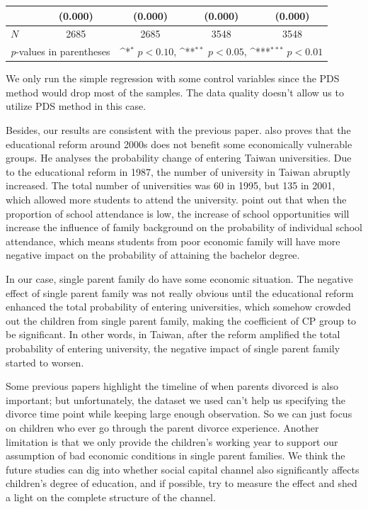 \documentclass[]{AEA}
\def\sym#1{\ifmmode^{#1}\else\(^{#1}\)\fi}
\begin{document}
\begin{center}
\begin{table}
\begin{tabular}{l*{4}c}
                &     (0.000)         &     (0.000)         &     (0.000)         &     (0.000)         \\
    \hline
    \(N\)       &        2685         &        2685         &        3548         &        3548         \\
    \hline\hline
    \multicolumn{2}{l}{\footnotesize \textit{p}-values in parentheses} & \multicolumn{3}{r}{\footnotesize \sym{*} \(p<0.10\), \sym{**} \(p<0.05\), \sym{***} \(p<0.01\)}\\
    \end{tabular}
    \begin{tablenotes}
        We only run the simple regression with some control variables since the PDS method would drop most of the samples. The data quality doesn't allow us to utilize PDS method in this case.
    \end{tablenotes}
    \end{table}
    \end{center}

    Besides, our results are consistent with the previous paper.  \cite{Luoh2004}  also proves that the educational reform around 2000s does not benefit some economically vulnerable groups. He analyses the probability change of entering Taiwan universities. Due to the educational reform in 1987, the number of university in Taiwan abruptly increased. The total number of universities was 60 in 1995, but 135 in 2001, which allowed more students to attend the university.  \cite{Luoh2004} point out that when the proportion of school attendance is low, the increase of school opportunities will increase the influence of family background on the probability of individual school attendance, which means students from poor economic family will have more negative impact on the probability of attaining the bachelor degree. 
   
    In our case, single parent family do have some economic situation. The negative effect of single parent family was not really obvious until the educational reform enhanced the total probability of entering universities, which somehow crowded out the children from single parent family, making the coefficient of CP group to be significant. In other words, in Taiwan, after the reform amplified the total probability of entering university, the negative impact of single parent family started to worsen.

    Some previous papers highlight the timeline of when parents divorced is also important; but unfortunately, the dataset we used can't help us specifying the divorce time point while keeping large enough observation.  So we can just focus on children who ever go through the parent divorce experience.  Another limitation is that we only provide the children's working year to support our assumption of bad economic conditions in single parent families.  We think the future studies can dig into whether social capital channel also significantly affects children's degree of education, and if possible, try to measure the effect and shed a light on the complete structure of the channel.





\end{document}
